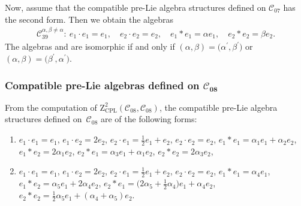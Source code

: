 \documentclass[pdftex]{sigma}
\numberwithin{equation}{section}
\begin{document}
Now, assume that the compatible pre-Lie algebra structures defined on $\mathcal{C%
}_{07}$ has the second form. Then we obtain the algebras
\begin{gather*}
\mathcal{C}_{39}^{\alpha ,\beta \neq \alpha } \colon \
e_{1}\cdot e_{1}=e_{1}, \quad e_{2}\cdot e_{2}=e_{2}, \quad
e_{1}\ast e_{1}=\alpha e_{1}, \quad e_{2}\ast e_{2}=\beta e_{2}.
\end{gather*}
The algebras  and \smash{$\mathcal{C}_{39}^{\alpha
^{\prime },\beta ^{\prime }}$} are isomorphic if and only if
$(\alpha,\beta)= \bigl(\alpha^{\prime },\beta ^{\prime }\bigr)$ or
$(\alpha,\beta)= \bigl(\beta^{\prime },\alpha ^{\prime }\bigr)$.


\subsubsection[Compatible pre-Lie algebras defined on C\_\{08\}]{Compatible pre-Lie algebras defined on $\boldsymbol{\mathcal{C}_{08}}$}

From the computation of $\mathrm{Z}_{\mathrm{CPL}}^{2}(\mathcal{C}_{08},%
\mathcal{C}_{08})$, the compatible pre-Lie algebra structures defined on~$%
\mathcal{C}_{08}$ are of the following forms:
\begin{enumerate}\itemsep=0pt
\item[(1)] $e_{1}\cdot e_{1}=e_{1}$, $e_{1}\cdot e_{2}=2e_{2}$, $e_{2}\cdot e_{1}=%
\frac{1}{2}e_{1}+e_{2}$, $e_{2}\cdot e_{2}=e_{2}$,
$e_{1}\ast e_{1}=\alpha _{1}e_{1}+\alpha _{2}e_{2}$, $e_{1}\ast
e_{2}=2\alpha _{1}e_{2}$, $e_{2}\ast e_{1}=\alpha _{3}e_{1}+\alpha
_{1}e_{2}$, $e_{2}\ast e_{2}=2\alpha _{3}e_{2}$,

\item[(2)] $e_{1}\cdot e_{1}=e_{1}$, $e_{1}\cdot e_{2}=2e_{2}$, $e_{2}\cdot e_{1}=
\frac{1}{2}e_{1}+e_{2}$, $e_{2}\cdot e_{2}=e_{2}$,
$e_{1}\ast e_{1}=\alpha _{4}e_{1}$, $e_{1}\ast e_{2}=\alpha
_{5}e_{1}+2\alpha _{4}e_{2}$,
$e_{2}\ast e_{1}=\bigl( 2\alpha _{5}+\frac{1%
}{2}\alpha _{4}\bigr) e_{1}+\alpha _{4}e_{2}$, $e_{2}\ast e_{2}=\frac{1}{2
}\alpha _{5}e_{1}+( \alpha _{4}+\alpha _{5}) e_{2}$.
\end{enumerate}
\end{document}

